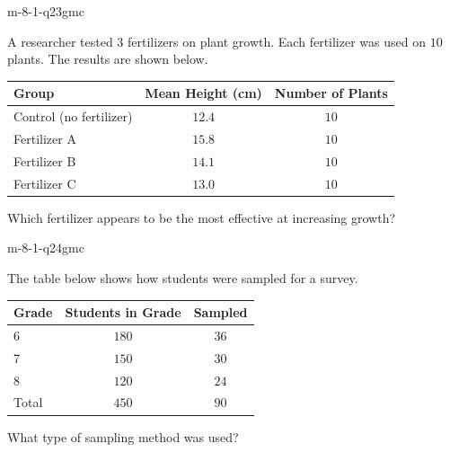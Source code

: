 \begin{practiceQuestion}{m-8-1-q23}{gmc}
\begin{questionText}
A researcher tested $3$ fertilizers on plant growth. Each fertilizer was used on $10$ plants. The results are shown below.

\begin{center}
\begin{tabular}{|l|c|c|}
\hline
\textbf{Group} & \textbf{Mean Height (cm)} & \textbf{Number of Plants} \\
\hline
Control (no fertilizer) & $12.4$ & $10$ \\
Fertilizer A & $15.8$ & $10$ \\
Fertilizer B & $14.1$ & $10$ \\
Fertilizer C & $13.0$ & $10$ \\
\hline
\end{tabular}
\end{center}

Which fertilizer appears to be the most effective at increasing growth?
\end{questionText}
\end{practiceQuestion}

\begin{practiceQuestion}{m-8-1-q24}{gmc}
\begin{questionText}
The table below shows how students were sampled for a survey.

\begin{center}
\begin{tabular}{|l|c|c|}
\hline
\textbf{Grade} & \textbf{Students in Grade} & \textbf{Sampled} \\
\hline
6 & $180$ & $36$ \\
7 & $150$ & $30$ \\
8 & $120$ & $24$ \\
\hline
Total & $450$ & $90$ \\
\hline
\end{tabular}
\end{center}

What type of sampling method was used?
\end{questionText}
\end{practiceQuestion}

